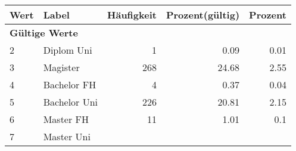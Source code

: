      \begin{longtable}{lXrrr}
     \toprule
     \textbf{Wert} & \textbf{Label} & \textbf{Häufigkeit} & \textbf{Prozent(gültig)} & \textbf{Prozent} \\
     \endhead
     \midrule
     \multicolumn{5}{l}{\textbf{Gültige Werte}}\\

     2 &
     \multicolumn{1}{X}{ Diplom Uni   } &


       \num{1} &
       \num[round-mode=places,round-precision=2]{0.09} &
         \num[round-mode=places,round-precision=2]{0.01} \\

     3 &
     \multicolumn{1}{X}{ Magister   } &


       \num{268} &
       \num[round-mode=places,round-precision=2]{24.68} &
         \num[round-mode=places,round-precision=2]{2.55} \\

     4 &
     \multicolumn{1}{X}{ Bachelor FH   } &


       \num{4} &
       \num[round-mode=places,round-precision=2]{0.37} &
         \num[round-mode=places,round-precision=2]{0.04} \\

     5 &
     \multicolumn{1}{X}{ Bachelor Uni   } &


       \num{226} &
       \num[round-mode=places,round-precision=2]{20.81} &
         \num[round-mode=places,round-precision=2]{2.15} \\

     6 &
     \multicolumn{1}{X}{ Master FH   } &


       \num{11} &
       \num[round-mode=places,round-precision=2]{1.01} &
         \num[round-mode=places,round-precision=2]{0.1} \\

     7 &
     \multicolumn{1}{X}{ Master Uni   } &



\end{longtable}
